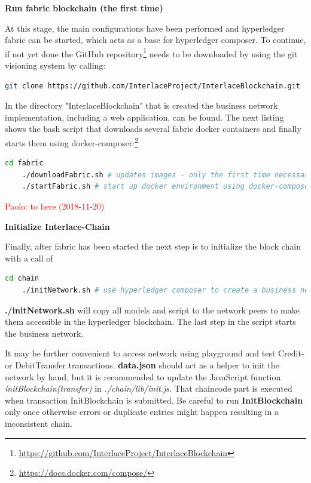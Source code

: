 \textbf{Run fabric blockchain (the first time)}

At this stage, the main configurations have been performed and hyperledger fabric can be started, which acts as a base for hyperledger composer. To continue, if not yet done the GitHub repository\footnote{\url{https://github.com/InterlaceProject/InterlaceBlockchain}} needs to be downloaded by using the git visioning system by calling:

\begin{lstlisting}[language=bash]
	git clone https://github.com/InterlaceProject/InterlaceBlockchain.git
\end{lstlisting}

In the directory "InterlaceBlockchain" that is created the business network implementation, including a web application, can be found. The next listing shows the bash script that downloads several fabric docker containers and finally starts them using docker-composer:\footnote{\url{https://docs.docker.com/compose/}}

\begin{lstlisting}[language=bash]
	cd fabric
	./downloadFabric.sh # updates images - only the first time necessary
	./startFabric.sh # start up docker environment using docker-compose
\end{lstlisting}


\textcolor{red}{Paolo: to here (2018-11-20)}


\textbf{Initialize Interlace-Chain}

Finally, after fabric has been started the next step is to initialize the block chain with a call of

\begin{lstlisting}[language=bash]
	cd chain
	./initNetwork.sh # use hyperledger composer to create a business network and deploy it
\end{lstlisting}

\textbf{./initNetwork.sh} will copy all models and script to the network peers to make them accessible in the hyperledger blockchain. The last step in the script starts the business network.

It may be further convenient to access network using playground and test Credit- or DebitTransfer transactions. \textbf{data.json} should act as a helper to init the network by hand, but it is recommended to update the JavaScript function \textit{initBlockchain(transfer)} in \textit{./chain/lib/init.js}. That chaincode part is executed when transaction InitBlockchain is submitted. Be careful to run \textbf{InitBlockchain} only once otherwise errors or duplicate entries might happen resulting in a inconsistent chain.

